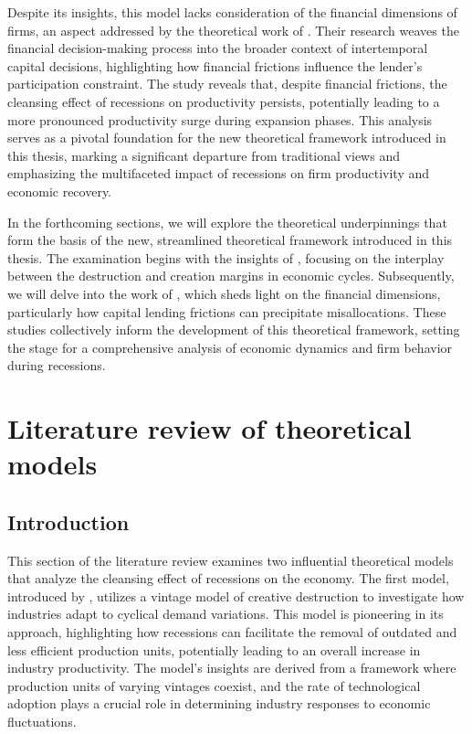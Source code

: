 \documentclass[12pt]{report}
\begin{document}
Despite its insights, this model lacks consideration of the financial dimensions of firms, an aspect addressed by the
theoretical work of \cite{OsePap17}. Their research weaves the financial decision-making process into the
broader context of intertemporal capital decisions, highlighting how financial frictions influence the lender's
participation constraint. The study reveals that, despite financial frictions, the cleansing effect of recessions on
productivity persists, potentially leading to a more pronounced productivity surge during expansion phases. This
analysis serves as a pivotal foundation for the new theoretical framework introduced in this thesis, marking a
significant departure from traditional views and emphasizing the multifaceted impact of recessions on firm productivity
and economic recovery. 

In the forthcoming sections,  we will explore the
theoretical underpinnings that form the basis of the new, streamlined theoretical framework introduced in this thesis.
The examination begins with the insights of \cite{CabHarm94}, focusing on the interplay between the
destruction and creation margins in economic cycles. Subsequently, we will delve into the work of \cite{OsePap17}, which sheds light on the financial dimensions, particularly how capital lending frictions can precipitate
misallocations. These studies collectively inform the development of this theoretical framework, setting the stage for a
comprehensive analysis of economic dynamics and firm behavior during recessions. 

\section{Literature review of theoretical models}
\subsection{Introduction}
This section of the literature review examines two influential theoretical models that analyze the cleansing effect of
recessions on the economy. The first model, introduced by \cite{CabHarm94}, utilizes a vintage model of
creative destruction to investigate how industries adapt to cyclical demand variations. This model is pioneering in its
approach, highlighting how recessions can facilitate the removal of outdated and less efficient production units,
potentially leading to an overall increase in industry productivity. The model's insights are derived from a framework
where production units of varying vintages coexist, and the rate of technological adoption plays a crucial role in
determining industry responses to economic fluctuations.
\end{document}
